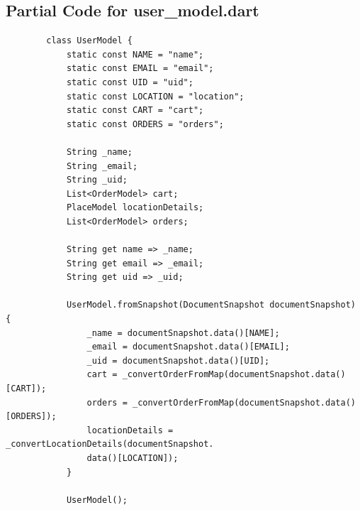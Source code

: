 \documentclass[12pt]{article}
\begin{document}
	\subsection{Partial Code for user\_model.dart}
	\label{code:user-model}
	\begin{verbatim}
		class UserModel {
			static const NAME = "name";
			static const EMAIL = "email";
			static const UID = "uid";
			static const LOCATION = "location";
			static const CART = "cart";
			static const ORDERS = "orders";
			
			String _name;
			String _email;
			String _uid;
			List<OrderModel> cart;
			PlaceModel locationDetails;
			List<OrderModel> orders;
			
			String get name => _name;
			String get email => _email;
			String get uid => _uid;
			
			UserModel.fromSnapshot(DocumentSnapshot documentSnapshot) {
				_name = documentSnapshot.data()[NAME];
				_email = documentSnapshot.data()[EMAIL];
				_uid = documentSnapshot.data()[UID];
				cart = _convertOrderFromMap(documentSnapshot.data()[CART]);
				orders = _convertOrderFromMap(documentSnapshot.data()[ORDERS]);
				locationDetails = _convertLocationDetails(documentSnapshot.
				data()[LOCATION]);
			}
			
			UserModel();
	\end{verbatim}



	
\end{document}
